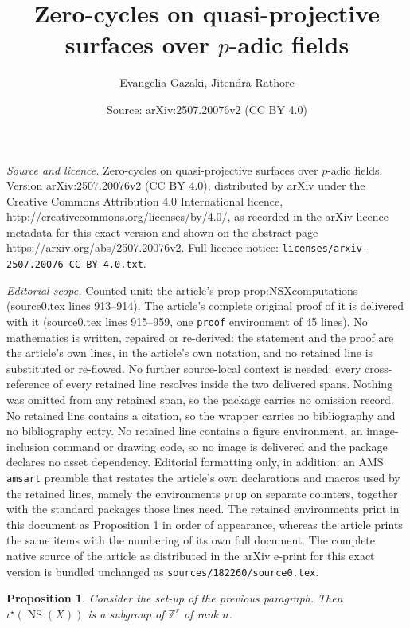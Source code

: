 \documentclass[10pt,a4paper]{amsart}
\title{Zero-cycles on quasi-projective surfaces over $p$-adic fields}
\author{Evangelia Gazaki, Jitendra Rathore}
\date{Source: arXiv:2507.20076v2 (CC BY 4.0)}
\newtheorem{prop}{Proposition}
\newcommand{\NS}{{\operatorname{NS}}}
\newcommand{\Z}{{\mathbb Z}}
\begin{document}
\maketitle

\noindent\emph{Source and licence.} Zero-cycles on quasi-projective surfaces over $p$-adic fields. Version arXiv:2507.20076v2 (CC BY 4.0), distributed by arXiv under the Creative Commons Attribution 4.0 International licence, http://creativecommons.org/licenses/by/4.0/, as recorded in the arXiv licence metadata for this exact version and shown on the abstract page https://arxiv.org/abs/2507.20076v2. Full licence notice: \texttt{licenses/arxiv-2507.20076-CC-BY-4.0.txt}.\par\smallskip

\noindent\textit{Editorial scope.} Counted unit: the article's prop prop:NSXcomputations (source0.tex lines 913--914). The article's complete original proof of it is delivered with it (source0.tex lines 915--959, one \texttt{proof} environment of 45 lines). No mathematics is written, repaired or re-derived: the statement and the proof are the article's own lines, in the article's own notation, and no retained line is substituted or re-flowed.  No further source-local context is needed: every cross-reference of every retained line resolves inside the two delivered spans.  Nothing was omitted from any retained span, so the package carries no omission record.  No retained line contains a citation, so the wrapper carries no bibliography and no bibliography entry.  No retained line contains a figure environment, an image-inclusion command or drawing code, so no image is delivered and the package declares no asset dependency.  Editorial formatting only, in addition: an AMS \texttt{amsart} preamble that restates the article's own declarations and macros used by the retained lines, namely the environments \texttt{prop} on separate counters, together with the standard packages those lines need.  The retained environments print in this document as Proposition 1 in order of appearance, whereas the article prints the same items with the numbering of its own full document.  The complete native source of the article as distributed in the arXiv e-print for this exact version is bundled unchanged as \texttt{sources/182260/source0.tex}.
\begin{prop}\label{prop:NSXcomputations} Consider the set-up of the previous paragraph. Then $\iota^\star(\NS(X))$ is a subgroup of $\Z^r$ of rank $n$. 
\end{prop}
\end{document}
